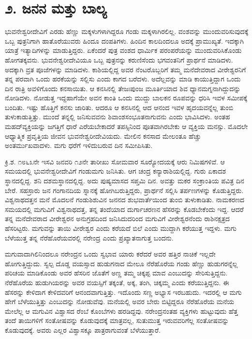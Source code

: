 
\chapter*{೨. ಜನನ ಮತ್ತು ಬಾಲ್ಯ }

ಭುವನೇಶ್ವರೀದೇವಿಗೆ ಎರಡು ಹೆಣ್ಣು ಮಕ್ಕಳುಗಳಾಗಿದ್ದರೂ ಗಂಡು ಮಕ್ಕಳಾಗಿರಲಿಲ್ಲ. ವಂಶವನ್ನು ಮುಂದುವರಿಸುವುದಕ್ಕೆ ಒಬ್ಬ ಪುತ್ರನಿಗಾಗಿ ಹಾತೊರೆಯುವರು ಹಿಂದೂ ದಂಪತಿಗಳು. ಹಿಂದಿನ ಕಾಲದಿಂದಲೂ ಅದಕ್ಕೆ ಪ್ರಾಮುಖ್ಯತೆ. ಇದಕ್ಕಾಗಿ ಯಾತ್ರೆ ಇತ್ಯಾದಿಗಳನ್ನು ಮಾಡುತ್ತಿದ್ದರು. ಏಕೆಂದರೆ ಪುತ್ರ ವಂಶದ ಧಾರ್ಮಿಕ ಪರಂಪರೆಯನ್ನು ಮುಂದುವರಿಸಿಕೊಂಡು ಹೋಗತಕ್ಕವನು. ಭುವನೇಶ್ವರೀದೇವಿಯೂ ಒಬ್ಬ ಪುತ್ರನನ್ನು ಕರುಣಿಸೆಂದು ಭಗವಂತನಿಗೆ ಪ್ರಾರ್ಥನೆ ಮಾಡಿದಳು. ಅದಕ್ಕಾಗಿ ವ್ರತ ಪೂಜೆಗಳನ್ನು ಮಾಡಿದಳು. ಕಾಶಿಯಲ್ಲಿದ್ದ ಅವರ ನೆಂಟರೊಬ್ಬರಿಗೆ ತಮ್ಮ ಮನೆದೇವರಾದ ವೀರೇಶ್ವರನಿಗೆ ತನ್ನ ಪರವಾಗಿ ಒಂದು ಹರಕೆಯನ್ನು ಸಲ್ಲಿಸು ಎಂದು ಕಾಗದ ಬರೆದಳು. ಅದೆಲ್ಲವನ್ನು ಮಾಡಿ ಕಾಯುತ್ತಿದ್ದಾಗ ಒಂದು ದಿನ ರಾತ್ರಿ ಅವಳಿಗೊಂದು ಕನಸಾಯಿತು. ಆ ಕನಸಿನಲ್ಲಿ ತೇಜಃಪುಂಜ ಮೂರ್ತಿಯಾದ ಶಿವ ಧ್ಯಾನಮಗ್ನನಾಗಿದ್ದುದನ್ನು ನೋಡಿದಳು. ನೋಡುತ್ತ ಇದ್ದಹಾಗೆಯೇ ಅವನ ಕಾಂತಿ ಒಂದು ಮುದ್ದು ಬಾಲಕನ ರೂಪವನ್ನು ಧರಿಸಿ ಇವಳ ಸಮೀಪಕ್ಕೆ ಬಂದಿತು. ಇಷ್ಟು ಹೊತ್ತಿಗೆ ಕನಸು ಜಾರಿತು. ಆದರೂ ಆ ಕನಸಿನಲ್ಲಿ ಆದ ಆನಂದ ಇವಳ ಹೃದಯವನ್ನೆಲ್ಲ ತುಂಬಿ ತುಳುಕಾಡುತ್ತಿತ್ತು. ಮುಂದೆ ತನ್ನಲ್ಲಿ ಜನಿಸುವವನು ಶಿವಾಂಶಸಂಭೂತನಾಗುವನು ಎಂದು ಭಾವಿಸಿದಳು. ಅಂತಹ ಮಹದ್‍ವ್ಯಕ್ತಿಯನ್ನು ಜಗತ್ತಿಗೆ ಧಾರೆ ಎರೆಯಬೇಕಾದರೆ ತಪಸ್ಸಿನಿಂದ ಪೂತವಾಗಿರಬೇಕು ಆ ವ್ಯಕ್ತಿಯ ಮನಸ್ಸು. ಮೊದಲೇ ಆಧ್ಯಾತ್ಮಿಕ ಪ್ರವೃತ್ತಿಯ ಜೀವನ ಭುವನೇಶ್ವರೀದೇವಿಯದು. ಮೇಲಿನ ಕನಸಾದ ಮೇಲಂತೂ ಹೆಚ್ಚು ಅಂತರ್ಮುಖವಾದಳು. ಮಗು ಧರೆಗೆ ಇಳಿದುಬರುವ ದಿನ ಸಮೀಪಿಸಿತು.

ಕ್ರಿ.ಶ. ೧೮೬೩ನೇ ಇಸವಿ ಜನವರಿ ೧೨ನೇ ತಾರೀಖು ಸೋಮವಾರ ಸೂರ‍್ಯೋದಯಕ್ಕೆ ಆರು ನಿಮಿಷಗಳಿವೆ. ಆ ಸಮಯದಲ್ಲಿ ಭುವನೇಶ್ವರೀದೇವಿಗೆ ಗಂಡುಮಗು ಜನಿಸಿತು. ಆಗ ಚಂದ್ರ ಕನ್ಯಾರಾಶಿಯಲ್ಲಿದ್ದ. ಗುರು ಏಕಾದಶ ಸ್ಥಾನದಲ್ಲಿದ್ದ. ಶನಿ ದಶಮಸ್ಥಾನದಲ್ಲಿದ್ದ. ಅದು ಪುಷ್ಯಮಾಸದ ಸಪ್ತಮಿ ದಿನ. ಅವತ್ತು ಮಕರ ಸಂಕ್ರಾಂತಿಯ ಪವಿತ್ರ ದಿನ ಬೇರೆ. ಸಹಸ್ರಾರು ಜನ ಗಂಗಾನದಿಯ ಸ್ನಾನಕ್ಕೆ ಹೋಗಿಬರುತ್ತಿದ್ದರು, ಪ್ರಾರ್ಥನೆ ಸಲ್ಲಿಸಿ ತರ್ಪಣಗಳನ್ನು ಕೊಡುತ್ತಿದ್ದರು. ವಿಶ್ವನಾಥದತ್ತನ ಮನೆ ಮೊದಲನೆ ಗಂಡುಶಿಶುವಿನ ಜನನದ ಶುಭವಾರ್ತೆಯಿಂದ ತುಂಬಿ ತುಳುಕಾಡಿತು. ನಾಮಕರಣದ ಸಮಯದಲ್ಲಿ ಮಗುವಿಗೆ ವಿಶ್ವನಾಥದತ್ತ, ತನ್ನ ತಂದೆಯಾದ ದುರ್ಗಾಚರಣನ ಹೆಸರನ್ನು ಕೊಡಬೇಕೆಂದು ಇದ್ದ. ಆದರೆ ತನ್ನ ಮನೆದೇವರಾದ ವೀರೇಶ್ವರನ ಅನುಗ್ರಹದಿಂದ ಜನಿಸಿದುದರಿಂದ ಮಗುವಿಗೆ ವೀರೇಶ್ವರನೆಂದು ರಾಶಿನಕ್ಷತ್ರದ ಹೆಸರಿಟ್ಟರು. ಮಗುವನ್ನು ತಾಯಿ ವೀರೇಶ್ವರ ಎಂದು ಕರೆಯದೆ ಬಿಲೆ ಎಂದು ಮುದ್ದಾಗಿ ಕರೆಯುತ್ತ ಇದ್ದಳು. ಮಗು ಬೆಳೆಯುತ್ತ ತನ್ನ ನೆರೆಹೊರೆಯವರಲ್ಲಿ ನರೇಂದ್ರ ಎಂದು ಪ್ರಖ್ಯಾತನಾಗುತ್ತ ಬಂದನು. 

ಮಗುವಾದಾಗಿಲಿನಿಂದಲೂ ನರೇಂದ್ರನ ಒಂದು ಸ್ವಭಾವ ಯಾರು ಕರೆದರೆ ಅವರ ಹತ್ತಿರ ನಾಚಿಕೆ ಇಲ್ಲದೇ ಹೋಗುತ್ತಿದ್ದುದು. ಸ್ವಲ್ಪ ದೊಡ್ಡ ವಯಸ್ಸಾದ ಹುಡುಗನಾದ ಮೇಲೂ ನೆರೆಹೊರೆಯ ಗಂಡು ಹೆಣ್ಣು ಹುಡುಗರನ್ನೆಲ್ಲ ಪರಿಚಯ ಮಾಡಿಕೊಂಡು ಅವರ ಹೆಸರಿನ ಜೊತೆಗೆ ಅಣ್ಣ ತಮ್ಮ ಚಿಕ್ಕಪ್ಪ ಮಾವ ಎಂಬುದನ್ನು ಸೇರಿಸುತ್ತಿದ್ದನು. ನೆರೆಹೊರೆಯ ಹುಡುಗಿಯರನ್ನು ಅವರ ವಯಸ್ಸಿಗೆ ತಕ್ಕಂತೆ, ಅಕ್ಕ, ತಂಗಿ, ಚಿಕ್ಕಮ್ಮ ಎಂದು ಕರೆಯುತ್ತಿದ್ದನು. ಈ ಹೆಸರನ್ನು ಕೇಳಿದಾಗ ಕೇಳಿದವರಿಗೆ ಆನಂದವಾಗುತ್ತಿತ್ತು. ಇದೊಂದು ಸಣ್ಣ ಅಭ್ಯಾಸ ಇರಬಹುದು. ಇದರಲ್ಲಿ ಆ ಮಗು ಹೇಗೆ ಬೆಳೆಯುತ್ತಿತ್ತು ಎಂಬುದನ್ನು ನೋಡುವೆವು. ಮನೆಯಲ್ಲಿ ಅವರ ಬೇರು ಬಿಟ್ಟಿದ್ದರೂ ನೆರೆಹೊರೆಯ ಮನೆಯ ಮೇಲೆಲ್ಲ ಆ ಮಗುವಿನ ವಿಶ್ವಾಸದ ರೆಂಬೆ ಕೊಂಬೆಗಳು ಹರಡಿದ್ದವು. ನರೇಂದ್ರನಂತಹ ವ್ಯಕ್ತಿಗಳು ಹುಟ್ಟುವುದು ಹೆತ್ತ ತಂದೆ ತಾಯಿಗಳಿಗೆ ಸಂತೋಷವನ್ನು ಕೊಡುವುದಕ್ಕೆ ಮಾತ್ರವಲ್ಲ, ಸುತುಮುತ್ತ ಇರುವವರಿಗೆಲ್ಲ ಸಂತೋಷವನ್ನು ಕೊಡುವುದಕ್ಕೆ. ಅವರು ಎಲ್ಲರ ವಿಶ್ವಾಸಕ್ಕೂ ಪಾತ್ರರಾಗುವಂತೆ ಬೆಳೆಯುತ್ತಾರೆ. 

